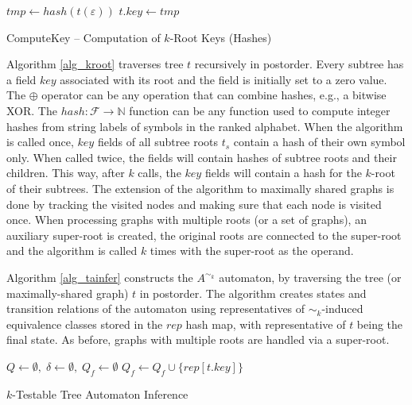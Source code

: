 \begin{algorithm}[H]
\BlankLine
$tmp \leftarrow hash(t(\varepsilon))$\;
$t.key \leftarrow tmp$\;
\caption{ComputeKey -- Computation of $k$-Root Keys (Hashes)}
\label{alg_kroot}
\end{algorithm}

Algorithm \ref{alg_kroot} traverses tree $t$ recursively in postorder. Every subtree has a field $key$ associated with its root and the field is initially set to a zero value. The $\oplus$ operator can be any operation that can combine hashes, e.g., a bitwise XOR. The $hash: \mathcal{F} \rightarrow \mathbb{N}$ function can be any function used to compute integer hashes from string labels of symbols in the ranked alphabet. When the algorithm is called once, $key$ fields of all subtree roots $t_s$ contain a hash of their own symbol only. When called twice, the fields will contain hashes of subtree roots and their children. This way, after $k$ calls, the $key$ fields will contain a hash for the $k$-root of their subtrees. The extension of the algorithm to maximally shared graphs is done by tracking the visited nodes and making sure that each node is visited once. When processing graphs with multiple roots (or a set of graphs), an auxiliary super-root is created, the original roots are connected to the super-root and the algorithm is called $k$ times with the super-root as the operand.

Algorithm \ref{alg_tainfer} constructs the $A^{\sim_k}$ automaton, by traversing the tree (or maximally-shared graph) $t$ in postorder. The algorithm creates states and transition relations of the automaton using representatives of $\sim_k$-induced equivalence classes stored in the $rep$ hash map, with representative of $t$ being the final state. As before, graphs with multiple roots are handled via a super-root.

\begin{algorithm}[h]
\BlankLine
$Q \leftarrow \emptyset, \; \delta \leftarrow \emptyset, \; Q_f \leftarrow \emptyset$\;
$Q_f \leftarrow Q_f \cup \{rep[t.key]\}$\;
\caption{$k$-Testable Tree Automaton Inference}
\label{alg_tainfer}
\end{algorithm}


